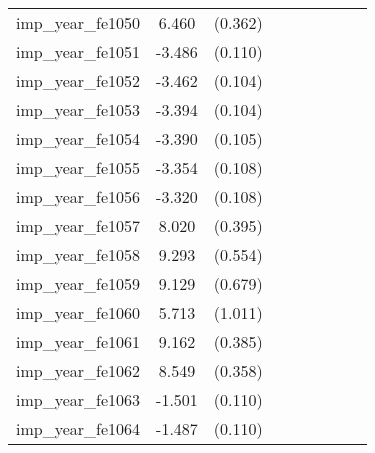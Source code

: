 {\begin{tabular}{l*{4}{cc}}
imp\_year\_fe1050&    6.460\sym{***}&  (0.362)&                  &         &                  &         &                  &         \\
imp\_year\_fe1051&   -3.486\sym{***}&  (0.110)&                  &         &                  &         &                  &         \\
imp\_year\_fe1052&   -3.462\sym{***}&  (0.104)&                  &         &                  &         &                  &         \\
imp\_year\_fe1053&   -3.394\sym{***}&  (0.104)&                  &         &                  &         &                  &         \\
imp\_year\_fe1054&   -3.390\sym{***}&  (0.105)&                  &         &                  &         &                  &         \\
imp\_year\_fe1055&   -3.354\sym{***}&  (0.108)&                  &         &                  &         &                  &         \\
imp\_year\_fe1056&   -3.320\sym{***}&  (0.108)&                  &         &                  &         &                  &         \\
imp\_year\_fe1057&    8.020\sym{***}&  (0.395)&                  &         &                  &         &                  &         \\
imp\_year\_fe1058&    9.293\sym{***}&  (0.554)&                  &         &                  &         &                  &         \\
imp\_year\_fe1059&    9.129\sym{***}&  (0.679)&                  &         &                  &         &                  &         \\
imp\_year\_fe1060&    5.713\sym{***}&  (1.011)&                  &         &                  &         &                  &         \\
imp\_year\_fe1061&    9.162\sym{***}&  (0.385)&                  &         &                  &         &                  &         \\
imp\_year\_fe1062&    8.549\sym{***}&  (0.358)&                  &         &                  &         &                  &         \\
imp\_year\_fe1063&   -1.501\sym{***}&  (0.110)&                  &         &                  &         &                  &         \\
imp\_year\_fe1064&   -1.487\sym{***}&  (0.110)&                  &         &                  &         &                  &         \\

\end{tabular}}
